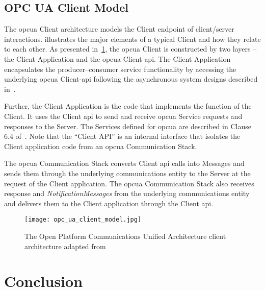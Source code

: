 \documentclass[
a4paper,
twoside,
headsepline,
cleardoublepage=empty,
parskip=half,
draft=false
]{scrbook}
\begin{document}
			\subsection{OPC UA Client Model}\label{subsec:opc_ua_client_model}

				The \gls{opcua} Client architecture models the Client endpoint of client/server interactions.
				 illustrates the major elements of a typical Client and how they relate to each other.
				As presented in~\cref{fig:opc_ua_client_model}, the \gls{opcua} Client is constructed by two layers -- the Client Application and the \gls{opcua} Client \gls{api}. The Client Application encapsulates the producer–consumer service functionality by accessing the underlying \gls{opcua} Client-\gls{api} following the asynchronous system designs described in~\cite{tanenbaum2007distributed}.
				
				Further, the Client Application is the code that implements the function of the Client.
				It uses the Client \gls{api} to send and receive \gls{opcua} Service requests and responses to the Server.
				The Services defined for \gls{opcua} are described in Clause 6.4 of~\cite{opcfoundation2017part4}.
				Note that the ``Client API'' is an internal interface that isolates the Client application code from an \gls{opcua} Communication Stack.
				
	\newpage
				
				The \gls{opcua} Communication Stack converts Client \gls{api} calls into Messages and sends them through the underlying communications entity to the Server at the request of the Client application.
				The \gls{opcua} Communication Stack also receives response and \textit{NotificationMessages} from the underlying communications entity and delivers them to the Client application through the Client \gls{api}.

				\begin{figure}[H]
					\centering
					\texttt{[image: opc\_ua\_client\_model.jpg]}
					\caption{The Open Platform Communications Unified Architecture client architecture adapted from~\cite{opcfoundation2017part1}}
					\label{fig:opc_ua_client_model}
				\end{figure}
			
		\section{Conclusion}\label{sec:foundations_conclusion}
		
\end{document}
